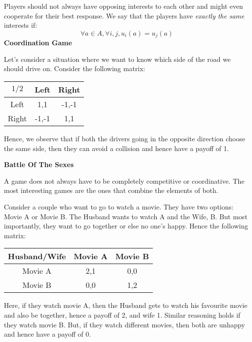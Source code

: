 		Players should not always have opposing interests to each other and might even cooperate for their best response.
		We say that the players have \textit{exactly the same} interests if: $$\forall a \in A, \forall i,j, u_i(a) = u_j(a)$$ 
		\textbf{Coordination Game}\newline
		
		Let's consider a situation where we want to know which side of the road we should drive on. Consider the following matrix:\\   
		\begin{center}
		\begin{tabular}{|c|c|c|}\hline
		$1/2$ & Left & Right \\ \hline
		Left &  1,1 & -1,-1 \\ \hline
		Right & -1,-1 & 1,1 \\ \hline
		\end{tabular}
		\end{center}
		Hence, we observe that if both the drivers going in the opposite direction choose the same side, then they can avoid a collision and hence have a payoff of 1.\newline
		
		\begin{flushleft}\textbf{Battle Of The Sexes}\end{flushleft}
		
		A game does not always have to be completely competitive or coordinative. The most interesting games are the ones that combine the elements of both.\newline
		
		Consider a couple who want to go to watch a movie. They have two options: Movie A or Movie B.
		The Husband wants to watch A and the Wife, B. But most importantly, they want to go together or else no one's happy. Hence the following matrix:
		\begin{center}
		\begin{tabular}{|c|c|c|}\hline
		Husband/Wife & Movie A & Movie B \\ \hline
		Movie A &  2,1 & 0,0 \\ \hline
		Movie B & 0,0 & 1,2 \\ \hline
		\end{tabular}
		\end{center}
		Here, if they watch movie A, then the Husband gets to watch his favourite movie and also be together, hence a payoff of 2, and wife 1. Similar reasoning holds if they watch movie B. But, if they watch different movies, then both are unhappy and hence have a payoff of 0.
		

		
